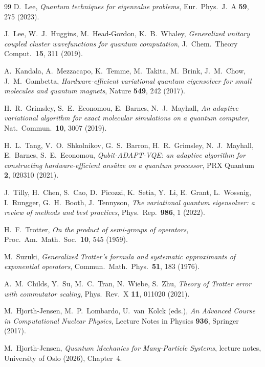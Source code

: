 \documentclass[
  aps,            %
  prc,            %
  reprint,        %
  superscriptaddress,
  floatfix,
  nofootinbib
]{revtex4-2}
\begin{document}
\begin{thebibliography}{99}
D.~Lee,
\textit{Quantum techniques for eigenvalue problems},
Eur.\ Phys.\ J.\ A \textbf{59}, 275 (2023).

J.~Lee, W.~J.~Huggins, M.~Head-Gordon, K.~B.~Whaley,
\textit{Generalized unitary coupled cluster wavefunctions for quantum computation},
J.\ Chem.\ Theory Comput.\ \textbf{15}, 311 (2019).

A.~Kandala, A.~Mezzacapo, K.~Temme, M.~Takita, M.~Brink, J.~M.~Chow,
J.~M.~Gambetta,
\textit{Hardware-efficient variational quantum eigensolver for small molecules
and quantum magnets},
Nature \textbf{549}, 242 (2017).

H.~R.~Grimsley, S.~E.~Economou, E.~Barnes, N.~J.~Mayhall,
\textit{An adaptive variational algorithm for exact molecular simulations on a
quantum computer},
Nat.\ Commun.\ \textbf{10}, 3007 (2019).

H.~L.~Tang, V.~O.~Shkolnikov, G.~S.~Barron, H.~R.~Grimsley, N.~J.~Mayhall,
E.~Barnes, S.~E.~Economou,
\textit{Qubit-ADAPT-VQE: an adaptive algorithm for constructing
hardware-efficient ans\"atze on a quantum processor},
PRX Quantum \textbf{2}, 020310 (2021).

J.~Tilly, H.~Chen, S.~Cao, D.~Picozzi, K.~Setia, Y.~Li, E.~Grant, L.~Wossnig,
I.~Rungger, G.~H.~Booth, J.~Tennyson,
\textit{The variational quantum eigensolver: a review of methods and best
practices},
Phys.\ Rep.\ \textbf{986}, 1 (2022).

H.~F.~Trotter,
\textit{On the product of semi-groups of operators},
Proc.\ Am.\ Math.\ Soc.\ \textbf{10}, 545 (1959).

M.~Suzuki,
\textit{Generalized Trotter's formula and systematic approximants of exponential
operators},
Commun.\ Math.\ Phys.\ \textbf{51}, 183 (1976).

A.~M.~Childs, Y.~Su, M.~C.~Tran, N.~Wiebe, S.~Zhu,
\textit{Theory of Trotter error with commutator scaling},
Phys.\ Rev.\ X \textbf{11}, 011020 (2021).

M.~Hjorth-Jensen, M.~P.~Lombardo, U.~van~Kolck (eds.),
\textit{An Advanced Course in Computational Nuclear Physics},
Lecture Notes in Physics \textbf{936}, Springer (2017).

M.~Hjorth-Jensen,
\textit{Quantum Mechanics for Many-Particle Systems},
lecture notes, University of Oslo (2026), Chapter~4.


\end{thebibliography}
\end{document}

